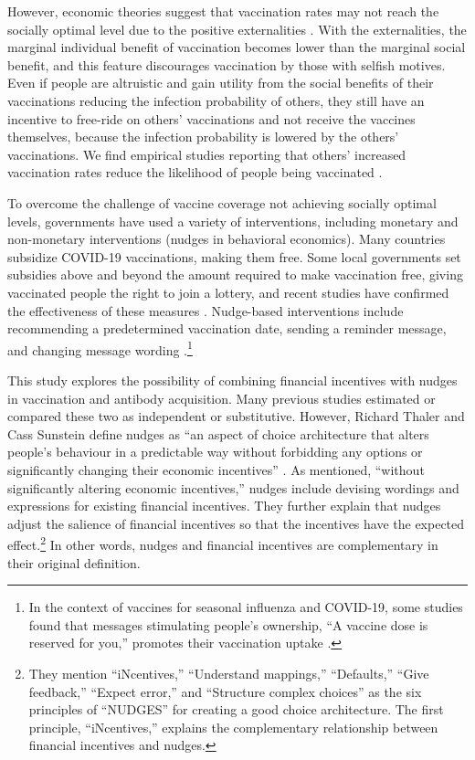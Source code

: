\documentclass[
]{article}
\begin{document}
However, economic theories suggest that vaccination rates may not reach the socially optimal level due to the positive externalities \citep{Brito1991a, Francis1997, Stiglitz2000}. With the externalities, the marginal individual benefit of vaccination becomes lower than the marginal social benefit, and this feature discourages vaccination by those with selfish motives. Even if people are altruistic and gain utility from the social benefits of their vaccinations reducing the infection probability of others, they still have an incentive to free-ride on others' vaccinations and not receive the vaccines themselves, because the infection probability is lowered by the others' vaccinations. We find empirical studies reporting that others' increased vaccination rates reduce the likelihood of people being vaccinated \citep{Hershey1994, Ibuka2014}.

To overcome the challenge of vaccine coverage not achieving socially optimal levels, governments have used a variety of interventions, including monetary and non-monetary interventions (nudges in behavioral economics). Many countries subsidize COVID-19 vaccinations, making them free. Some local governments set subsidies above and beyond the amount required to make vaccination free, giving vaccinated people the right to join a lottery, and recent studies have confirmed the effectiveness of these measures \citep{Barber2022, Brehm2022}. Nudge-based interventions include recommending a predetermined vaccination date, sending a reminder message, and changing message wording \citep{Chapman2010, Sasaki2022, Yokum2018}.\footnote{In the context of vaccines for seasonal influenza and COVID-19, some studies found that messages stimulating people's ownership, ``A vaccine dose is reserved for you,'' promotes their vaccination uptake \citep{Dai2021, Milkman2021}.}

This study explores the possibility of combining financial incentives with nudges in vaccination and antibody acquisition. Many previous studies estimated or compared these two as independent or substitutive. However, Richard Thaler and Cass Sunstein define nudges as ``an aspect of choice architecture that alters people's behaviour in a predictable way without forbidding any options or significantly changing their economic incentives'' \citep[p.6]{Thaler2009}. As mentioned, ``without significantly altering economic incentives,'' nudges include devising wordings and expressions for existing financial incentives. They further explain that nudges adjust the salience of financial incentives so that the incentives have the expected effect.\footnote{They mention ``iNcentives,'' ``Understand mappings,'' ``Defaults,'' ``Give feedback,'' ``Expect error,'' and ``Structure complex choices'' as the six principles of ``NUDGES'' for creating a good choice architecture. The first principle, ``iNcentives,'' explains the complementary relationship between financial incentives and nudges.} In other words, nudges and financial incentives are complementary in their original definition.
\end{document}
